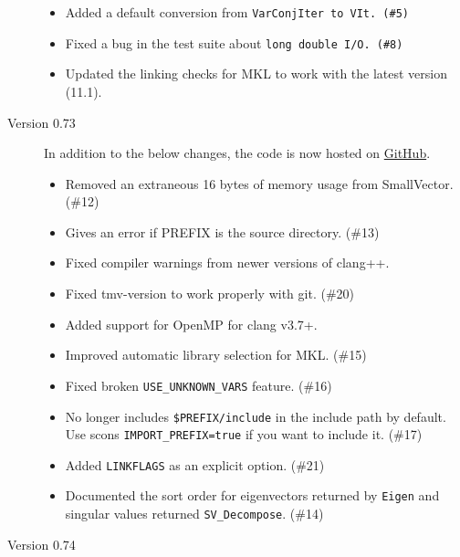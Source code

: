 \begin{description}
\begin{itemize}
\item
Added a default conversion from \tt{VarConjIter} to \tt{VIt}. (\#5)

\item 
Fixed a bug in the test suite about \tt{long double} I/O. (\#8)

\item
Updated the linking checks for MKL to work with the latest version (11.1).

\end{itemize}

\item[Version 0.73]

In addition to the below changes, the code is now hosted on
\href{\websitex}{GitHub}.

\begin{itemize}

\item
Removed an extraneous 16 bytes of memory usage from SmallVector. (\#12)

\item
Gives an error if PREFIX is the source directory. (\#13)

\item
Fixed compiler warnings from newer versions of clang++.

\item
Fixed tmv-version to work properly with git. (\#20)

\item
Added support for OpenMP for clang v3.7+.

\item
Improved automatic library selection for MKL. (\#15)

\item
Fixed broken \texttt{USE\_UNKNOWN\_VARS} feature. (\#16)

\item
No longer includes \texttt{\$PREFIX/include} in the include path by default.
Use scons \texttt{IMPORT\_PREFIX=true} if you want to include it. (\#17)

\item
Added \texttt{LINKFLAGS} as an explicit option. (\#21)

\item
Documented the sort order for eigenvectors returned by \texttt{Eigen}
and singular values returned \texttt{SV\_Decompose}. (\#14)

\end{itemize}

\item[Version 0.74]


\end{description}
